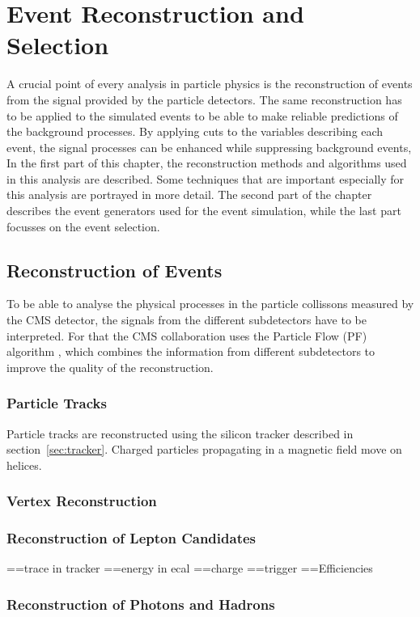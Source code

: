 \chapter{Event Reconstruction and Selection}
\label{chap::EventReconstructionandSelection}
A crucial point of every analysis in particle physics is the reconstruction of events from the signal provided by the particle detectors. The same reconstruction has to be applied to the simulated events to be able to make reliable predictions of the background processes. By applying cuts to the variables describing each event, the signal processes can be enhanced while suppressing background events,\\

\noindent In the first part of this chapter, the reconstruction methods and algorithms used in this analysis are described. Some techniques that are important especially for this analysis are portrayed in more detail. The second part of the chapter describes the event generators used for the event simulation, while the last part focusses on the event selection.
\section{Reconstruction of Events}
To be able to analyse the physical processes in the particle collissons measured by the CMS detector, the signals from the different subdetectors have to be interpreted. For that the CMS collaboration uses the Particle Flow (PF) algorithm \cite{PF}, which combines the information from different subdetectors to improve the quality of the reconstruction.
\subsection{Particle Tracks}
Particle tracks are reconstructed using the silicon tracker described in section~\ref{sec:tracker}.
Charged particles propagating in a magnetic field move on helices.

\subsection{Vertex Reconstruction}
\subsection{Reconstruction of Lepton Candidates}
==trace in tracker
==energy in ecal
==charge
==trigger
==Efficiencies
\subsection{Reconstruction of Photons and Hadrons}
